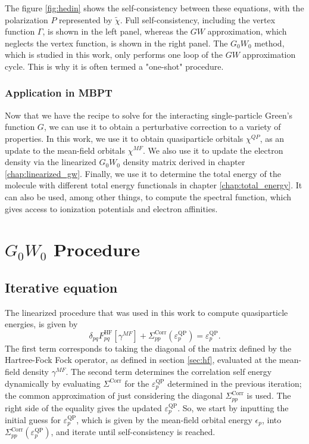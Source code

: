 \documentclass[12pt]{caltech_thesis}
\begin{document}
The figure \ref{fig:hedin} shows the self-consistency between these equations, with the polarization $P$ represented by $\tilde{\chi}$. Full self-consistency, including the vertex function $\Gamma$, is shown in the left panel, whereas the $GW$ approximation, which neglects the vertex function, is shown in the right panel. The $G_0W_0$ method, which is studied in this work, only performs one loop of the $GW$ approximation cycle. This is why it is often termed a "one-shot" procedure.
\subsection{Application in MBPT}
Now that we have the recipe to solve for the interacting single-particle Green's function $G$, we can use it to obtain a perturbative correction to a variety of properties.  In this work, we use it to obtain quasiparticle orbitals $\chi^{QP}$, as an update to the mean-field orbitals $\chi^{MF}$. We also use it to update the electron density via the linearized $G_0W_0$ density matrix derived in chapter \ref{chap:linearized_gw}. Finally, we use it to determine the total energy of the molecule with different total energy functionals in chapter \ref{chap:total_energy}. It can also be used, among other things, to compute the spectral function, which gives access to ionization potentials and electron affinities. \autocite{noauthor_frontiers_nodate}






\chapter{$G_0W_0$ Procedure}
\section{Iterative equation}
The linearized procedure that was used in this work to compute quasiparticle energies, is given by \autocite{bruneval_assessment_2019}
\begin{equation}
    \delta_{pq}F_{pq}^{\mathrm{HF}}[\gamma^{MF}] + \Sigma_{pp}^{\mathrm{Corr}}(\varepsilon_{p}^{\mathrm{QP}}) = \varepsilon_{p}^{\mathrm{QP}}.
\label{eq: Iterative equation}
\end{equation}
The first term corresponds to taking the diagonal of the matrix defined by the Hartree-Fock Fock operator, as defined in section \ref{sec:hf}, evaluated at the mean-field density $\gamma^{MF}$.
  The second term determines the correlation self energy dynamically by evaluating $\Sigma^{\mathrm{Corr}}$
for the $\varepsilon_{p}^{\mathrm{QP}}$ determined in the previous iteration; the common approximation of just considering the diagonal $\Sigma_{pp}^{\mathrm{Corr}}$ is used.
The right side of the equality gives the updated $\varepsilon_{p}^{\mathrm{QP}}$. So, we start by inputting the initial guess for $\varepsilon_{p}^{\mathrm{QP}}$, which is given by the mean-field orbital energy $\epsilon_p$, into $\Sigma_{pp}^{\mathrm{Corr}}(\varepsilon_{p}^{\mathrm{QP}})$, and iterate until self-consistency is reached.
\end{document}
